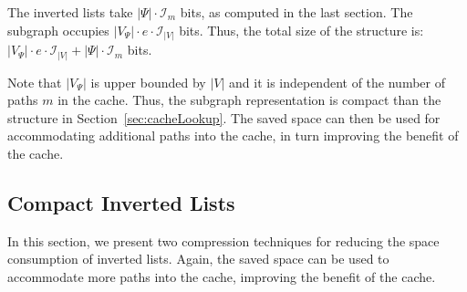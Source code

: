 \documentclass{sig-alternate}
\begin{document}
The inverted lists take $|\Psi| \cdot \mathcal{I}_m$ bits, as computed in the last section.
The subgraph occupies $|V_{\Psi}| \cdot e \cdot \mathcal{I}_{|V|}$ bits.
Thus, the total size of the structure is: $|V_{\Psi}| \cdot e \cdot \mathcal{I}_{|V|} + |\Psi| \cdot \mathcal{I}_m$ bits.

Note that $|V_{\Psi}|$ is upper bounded by $|V|$ and it is independent of the number of paths $m$ in the cache.
Thus, the subgraph representation is compact than the structure in Section~\ref{sec:cacheLookup}.
The saved space can then be used for accommodating additional paths into the cache,
in turn improving the benefit of the cache.






\subsection{Compact Inverted Lists}\label{sec:cacheCompress}
%
In this section, we present two compression techniques for reducing the space consumption
of inverted lists. Again, the saved space can be used to accommodate more paths into the cache,
improving the benefit of the cache.
\end{document}
